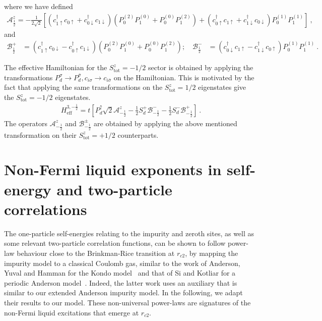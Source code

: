 \documentclass{iopart}
\begin{document}
where we have defined
\begin{eqnarray}
	\mathcal{A}^z_\frac{1}{2} = -\frac{1}{2\sqrt 2}\left[\left(c^\dagger_{1 \uparrow} c_{0 \uparrow} + c^\dagger_{0 \downarrow} c_{1 \downarrow}\right)\left( P_0^{(2)} P_1^{(0)} + P_0^{(0)} P_1^{(2)}\right) + \left(c^\dagger_{0 \uparrow} c_{1 \uparrow} + c^\dagger_{1 \downarrow} c_{0 \downarrow}\right) P_0^{(1)} P_1^{(1)}\right]~,
\end{eqnarray}
and
\begin{eqnarray}
	\mathcal{B}^+_\frac{1}{2} &= \left(c^\dagger_{1 \uparrow}c_{0 \downarrow} - c^\dagger_{0 \uparrow} c_{1 \downarrow} \right)\left( P_0^{(2)} P_1^{(0)} + P_0^{(0)} P_1^{(2)}\right); \quad\mathcal{B}^-_\frac{1}{2} &= \left(c^\dagger_{0 \downarrow}c_{1 \uparrow} - c^\dagger_{1 \downarrow} c_{0 \uparrow} \right) P_0^{(1)} P_1^{(1)}~.
\end{eqnarray}

The effective Hamiltonian for the \(S_\text{tot}^z = -1/2\) sector is obtained by applying the transformations \(P_d^\sigma \to P_d^{\bar\sigma}, c_{i\sigma} \to c_{i\bar\sigma}\) on the Hamiltonian. This is motivated by the fact that applying the same transformations on the \(S_\text{tot}^z = 1/2\) eigenstates give the \(S_\text{tot}^z = -1/2\) eigenstates.
\begin{eqnarray}
	H_\text{eff}^{3,-\frac{1}{2}} = t\left[P_d^{ \uparrow} \sqrt 2\mathcal{A}^z_{-\frac{1}{2}} - \frac{1}{2}S_d^+ \mathcal{B}^-_{-\frac{1}{2}} - \frac{1}{2}S_d^- \mathcal{B}^+_{-\frac{1}{2}}\right] ~.
\end{eqnarray}
The operators \(\mathcal{A}^z_{-\frac{1}{2}}\) and \(\mathcal{B}^\pm_{-\frac{1}{2}}\) are obtained by applying the above mentioned transformation on their \(S^z_\text{tot} = +1/2\) counterparts.

\section{Non-Fermi liquid exponents in self-energy and two-particle correlations}
The one-particle self-energies relating to the impurity and zeroth sites, as well as some relevant two-particle correlation functions, can be shown to follow power-law behaviour close to the Brinkman-Rice transition at \(r_{c2}\), by mapping the impurity model to a classical Coulomb gas, similar to the work of Anderson, Yuval and Hamman for the Kondo model~\cite{anderson1969exact} and that of Si and Kotliar for a periodic Anderson model~\cite{si_kotliar_1993}. Indeed, the latter work uses an auxiliary that is similar to our extended Anderson impurity model. In the following, we adapt their results to our model. These non-universal power-laws are signatures of the non-Fermi liquid excitations that emerge at \(r_{c2}\).
\end{document}
